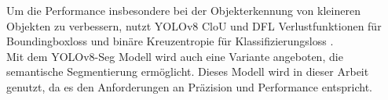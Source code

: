 {{	Um die Performance insbesondere bei der Objekterkennung von kleineren Objekten zu verbessern, nutzt YOLOv8 CloU \citep{Zheng2020} und DFL \citep{Li2020} Verlustfunktionen für Boundingboxloss und binäre Kreuzentropie für Klassifizierungsloss \citep{Terven2023}. \\

	Mit dem YOLOv8-Seg Modell wird auch eine Variante angeboten, die semantische Segmentierung ermöglicht. Dieses Modell wird in dieser Arbeit genutzt, da es den Anforderungen an Präzision und Performance entspricht.
	}
}
